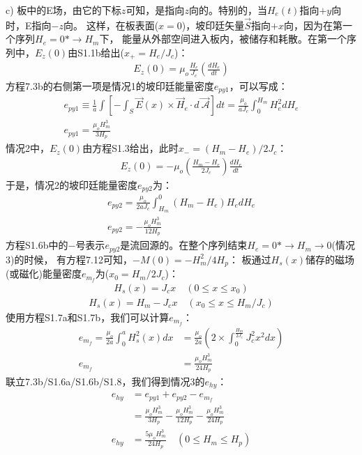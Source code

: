 c) 板中的E场，由它的下标$z$可知，是指向$z$向的。特别的，当$H_e(t)$指向$+y$向时，E指向$-z$向。
这样，在板表面($x=0$)，坡印廷矢量$\vec{S}$指向$+x$向，因为在第一个序列$H_e=0*\rightarrow H_m$下，
能量从外部空间进入板内，被储存和耗散。在第一个序列中，$E_z(0)$由S1.1b给出($x_+=H_e/J_c$)：
\begin{align*}%
E_z(0)=\mu_o\frac{H_e}{J_c}\left(\frac{dH_e}{dt}\right) \tag{S1.5a}
\end{align*}
方程7.3b的右侧第一项是情况1的坡印廷能量密度$e_{py1}$，可以写成：
\begin{align*}%
e_{py1}\equiv\frac{1}{a}\int\left[-\int_{S}\vec{E}(x)\times\vec{H}_e\cdot d\vec{\ \mathcal{A}}\right]dt=\frac{\mu_o}{aJ_c}\int_{0}^{H_m}H_{e}^{2}dH_e\\
e_{py1}=\frac{\mu_oH_{m}^{3}}{3H_p} \tag{S1.6a}
\end{align*}
情况2中，$E_z(0)$由方程S1.3给出，此时$x_-=(H_m-H_e)/2J_c$：
\begin{align*}%
E_z(0)=-\mu_o\left(\frac{H_m-H_e}{2J_c}\right)\frac{dH_e}{dt} \tag{S15.b}
\end{align*}
于是，情况2的坡印廷能量密度$e_{py2}$为：
\begin{align*}%
e_{py2}=\frac{\mu_o}{2aJ_c}\int_{H_m}^{0}(H_m-H_e)H_edH_e\\
e_{py2}=-\frac{\mu_oH_{m}^{3}}{12H_p} \tag{S1.6b}
\end{align*}
方程S1.6b中的$-$号表示$e_{py2}$是流回源的。在整个序列结束$H_e=0*\rightarrow H_m\rightarrow 0$(情况3)的时候，
有方程7.12可知，$-M(0)=-H_m^2/4H_p$：
板通过$H_s(x)$储存的磁场(或磁化)能量密度$e_{m_f}$为($x_0=H_m/2J_c$)：
\begin{align*}%
H_s(x)=J_cx  \quad      (0\leq x\leq x_0) \tag{S1.7a}
\end{align*}
\begin{align*}%
H_s(x)=H_m-J_cx  \quad  (x_0\leq x\leq H_m/J_c) \tag{S1.7b}
\end{align*}
使用方程S1.7a和S1.7b，我们可以计算$e_{m_f}$：
\begin{align*}%
e_{m_f}=\frac{\mu_o}{2a}\int_{0}^{a}H_{s}^{2}(x)dx&=\frac{\mu_o}{2a}\left(2\times\int_{0}^{\frac{H_m}{2J_c}}J_{c}^{2}x^2dx\right)\\
e_{m_f}&=\frac{\mu_oH_{m}^{3}}{24H_p} \tag{S1.8}
\end{align*}
联立7.3b/S1.6a/S1.6b/S1.8，我们得到情况3的$e_{hy}$：
\begin{align*}%
e_{hy}&=e_{py1}+e_{py2}-e_{m_f} \\
&=\frac{\mu_oH_{m}^{3}}{3H_p}-\frac{\mu_oH_{m}^{3}}{12H_p}-\frac{\mu_oH_{m}^{3}}{24H_p}\\
e_{hy}&=\frac{5\mu_oH_{m}^{3}}{24H_p}   \quad    (0\leq H_m\leq H_p) \tag{7.15a}
\end{align*}

